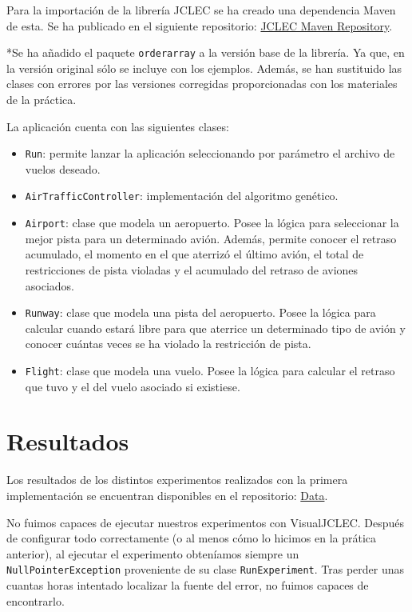 \documentclass[a4paper,12pt,titlepage]{article}
\begin{document}
Para la importación de la librería JCLEC se ha creado una dependencia Maven de esta. Se ha publicado en el siguiente repositorio: \href{https://github.com/davidmigloz/jclec\_maven\_repo}{JCLEC Maven Repository}. 

*Se ha añadido el paquete \lstinline|orderarray| a la versión base de la librería. Ya que, en la versión original sólo se incluye con los ejemplos. Además, se han sustituido las clases con errores por las versiones corregidas proporcionadas con los materiales de la práctica.

La aplicación cuenta con las siguientes clases:

\begin{itemize}[noitemsep]
	\item \lstinline|Run|: permite lanzar la aplicación seleccionando por parámetro el archivo de vuelos deseado.
	\item \lstinline|AirTrafficController|: implementación del algoritmo genético.
	\item \lstinline|Airport|: clase que modela un aeropuerto. Posee la lógica para seleccionar la mejor pista para un determinado avión. Además, permite conocer el retraso acumulado, el momento en el que aterrizó el último avión, el total de restricciones de pista violadas y el acumulado del retraso de aviones asociados.
	\item \lstinline|Runway|: clase que modela una pista del aeropuerto. Posee la lógica para calcular cuando estará libre para que aterrice un determinado tipo de avión y conocer cuántas veces se ha violado la restricción de pista.
	\item \lstinline|Flight|: clase que modela una vuelo. Posee la lógica para calcular el retraso que tuvo y el del vuelo asociado si existiese.
\end{itemize}


\section{Resultados}

Los resultados de los distintos experimentos realizados con la primera implementación se encuentran disponibles en el repositorio: \href{https://github.com/davidmigloz/evolutionary-computation/tree/p5a/P1\_AirTafficController/data}{Data}. 

No fuimos capaces de ejecutar nuestros experimentos con VisualJCLEC. Después de configurar todo correctamente (o al menos cómo lo hicimos en la prática anterior), al ejecutar el experimento obteníamos siempre un \lstinline|NullPointerException| proveniente de su clase \lstinline|RunExperiment|. Tras perder unas cuantas horas intentado localizar la fuente del error, no fuimos capaces de encontrarlo.
\end{document}
